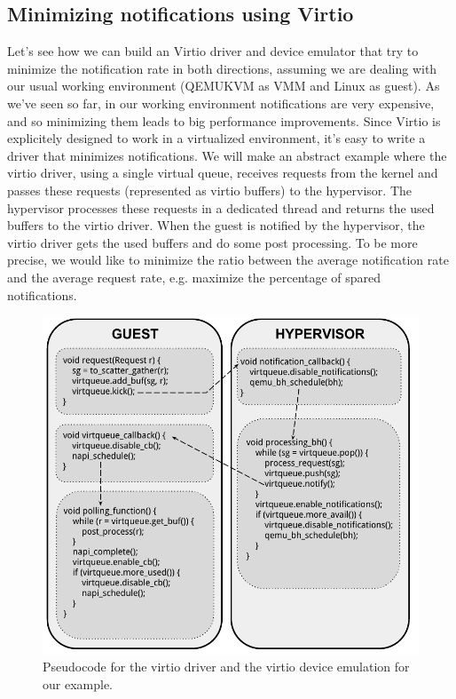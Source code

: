 

\subsection{Minimizing notifications using Virtio}
\label{sec:virtiomin}
Let's see how we can build an Virtio driver and device emulator that try to minimize the notification rate in both directions, assuming we
are dealing with our usual working environment (QEMUKVM as VMM and Linux as guest).
As we've seen so far, in our working environment notifications are very expensive, and so minimizing them leads to big performance
improvements. Since Virtio is explicitely designed to work in a virtualized environment, it's easy to write a driver that minimizes
notifications.
We will make an abstract example where the virtio driver, using a single virtual queue, receives requests from the kernel and passes
these requests (represented as virtio buffers) to the hypervisor. The hypervisor processes these requests in a dedicated thread and returns 
the used buffers to the virtio driver. When the guest is notified by the hypervisor, the virtio driver gets the used buffers and do some
post processing. To be more precise, we would like to minimize the ratio between the average notification rate and the average request rate,
e.g. maximize the percentage of spared notifications.

\vspace{0.5cm}

\begin{figure}[bt]
\centering
\includegraphics[scale = 1.0]{virtiocode.pdf}
\caption{Pseudocode for the virtio driver and the virtio device emulation for our example.}
\label{fig:virtiocode}
\end{figure}

